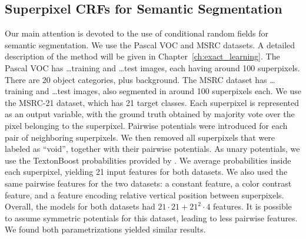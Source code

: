 \subsection{Superpixel CRFs for Semantic Segmentation}
Our main attention is devoted to the use of conditional random fields for
semantic segmentation.  We use the Pascal VOC and MSRC datasets. A detailed
description of the method will be given in Chapter~\ref{ch:exact_learning}.
The Pascal VOC has \ldots training and \ldots test images, each having
around 100 superpixels. There are 20 object categories, plus background. The %
MSRC dataset has \ldots training and \ldots test images, also segmented in
around 100 superpixels each. We use the MSRC-21 dataset, which has 21 target
classes.
Each superpixel is represented as an output variable, with the ground truth obtained
by majority vote over the pixel belonging to the superpixel.
Pairwise potentials were introduced for each pair of neighboring superpixels.
We then removed all superpixels that were labeled as ``void'', together with
their pairwise potentials.
As unary potentials, we use the TextonBoost probabilities provided by \citet{krahenbuhl2012efficient}.
We average probabilities inside each superpixel, yielding 21 input features for both datasets.
We also used the same pairwise features for the two datasets: a constant feature,
a color contrast feature, and a feature encoding relative vertical position between superpixels.
Overall, the models for both datasets had $21 \cdot 21 + 21^2 \cdot 4$ features.
It is possible to assume symmetric potentials for this dataset, leading to less
pairwise features. We found both parametrizations yielded similar results.


